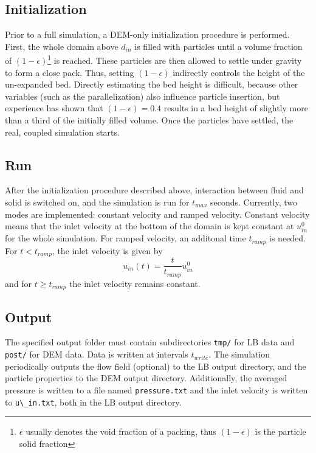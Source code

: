 \documentclass[12pt]{article}
\begin{document}
\subsection{Initialization}

Prior to a full simulation, a DEM-only initialization procedure is
performed. First, the whole domain above $d_{in}$ is filled with
particles until a volume fraction of
$(1-\epsilon)$\footnote{$\epsilon$ usually denotes the void fraction
  of a packing, thus $(1-\epsilon)$ is the particle solid fraction} is
reached. These particles are then allowed to settle under gravity to
form a close pack. Thus, setting $(1-\epsilon)$ indirectly controls
the height of the un-expanded bed. Directly estimating the bed height
is difficult, because other variables (such as the parallelization)
also influence particle insertion, but experience has shown that
$(1-\epsilon) = 0.4$ results in a bed height of slightly more than a
third of the initially filled volume. Once the particles have settled,
the real, coupled simulation starts. \\

\subsection{Run}

After the initialization procedure described above, interaction
between fluid and solid is switched on, and the simulation is run for
$t_{max}$ seconds. Currently, two modes are implemented: constant
velocity and ramped velocity. Constant velocity means that the inlet
velocity at the bottom of the domain is kept constant at $u_{in}^0$ for
the whole simulation. For ramped velocity, an additonal time
$t_{ramp}$ is needed. For $t < t_{ramp}$, the inlet velocity is given
by
\begin{equation}
  u_{in}(t) = \frac{t}{t_{ramp}} u_{in}^0
\end{equation}
and for $t \geq t_{ramp}$ the inlet velocity remains
constant. \\

\subsection{Output}

The specified output folder must contain subdirectories
\lstinline{tmp/} for LB data and \lstinline{post/} for DEM data. Data
is written at intervals $t_{write}$. The simulation periodically
outputs the flow field (optional) to the LB output directory, and the
particle properties to the DEM output directory. Additionally, the
averaged pressure is written to a file named \lstinline{pressure.txt}
and the inlet velocity is written to \lstinline{u\_in.txt}, both in
the LB output directory. \\
\end{document}
